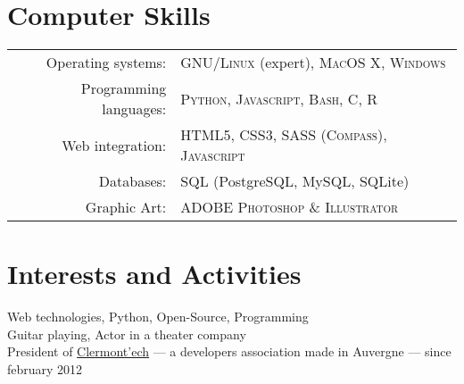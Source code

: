\documentclass[a4paper,10pt]{article}
\begin{document}

\section{Computer Skills}
\begin{tabular}{rl}
Operating systems:& \textsc{GNU/Linux} (expert), \textsc{MacOS X},  \textsc{Windows}\\
Programming languages:& \textsc{Python}, \textsc{Javascript}, \textsc{Bash}, \textsc{C}, \textsc{R}\\
Web integration:& \textsc{HTML5}, \textsc{CSS3}, \textsc{SASS} (\textsc{Compass}), \textsc{Javascript}\\
Databases:& \textsc{SQL} (PostgreSQL, MySQL, SQLite) \\
Graphic Art:& \textsc{ADOBE Photoshop} \& \textsc{Illustrator} \\
\end{tabular}

\section{Interests and Activities}
Web technologies, Python, Open-Source, Programming\\
Guitar playing, Actor in a theater company\\
President of \href{http://clermontech.org}{Clermont'ech} — a developers association made in Auvergne — since february 2012\\
\end{document}
